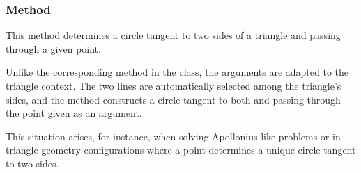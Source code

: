 \vspace{1em}


\begin{tkzexample}[latex=6cm]
\begin{center}
\end{center}
\end{tkzexample}

\subsubsection{Method }
\label{ssub:method_triangle_c_ll_p}

This method determines a circle tangent to two sides of a triangle and passing through a given point.

Unlike the corresponding method in the  class, the arguments are adapted to the triangle context. The two lines are automatically selected among the triangle’s sides, and the method constructs a circle tangent to both and passing through the point given as an argument.

This situation arises, for instance, when solving Apollonius-like problems or in triangle geometry configurations where a point determines a unique circle tangent to two sides.

\vspace{1em}


